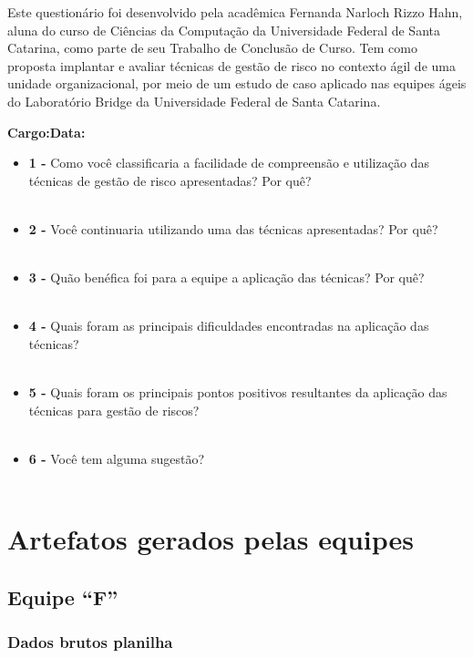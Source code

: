 \documentclass[
    12pt,       %
    openright,      %
    twoside,      %
    a4paper,      %
    english,      %
    french,       %
    spanish,      %
    brazil,       %
    ]{abntex2}
\begin{document}
\begin{apendicesenv}
 Este questionário foi desenvolvido pela acadêmica Fernanda Narloch Rizzo Hahn, aluna
do curso de Ciências da Computação da Universidade Federal de Santa Catarina, como
parte de seu Trabalho de Conclusão de Curso. Tem como proposta implantar e avaliar técnicas de gestão de risco no contexto ágil de uma unidade organizacional, por meio de um estudo de caso aplicado nas equipes ágeis do Laboratório Bridge da Universidade Federal de Santa Catarina.

\textbf{Cargo:}\hspace*{250pt}\textbf{Data:}

\begin{itemize} [label={}]
    \item \textbf{1 - } Como você classificaria a facilidade de compreensão e utilização das técnicas de gestão de risco apresentadas? Por quê? \\ \\
    \item \textbf{2 - } Você continuaria utilizando uma das técnicas apresentadas? Por quê? \\ \\
    \item \textbf{3 - } Quão benéfica foi para a equipe a aplicação das técnicas? Por quê? \\ \\
    \item \textbf{4 - } Quais foram as principais dificuldades encontradas na aplicação das técnicas? \\ \\
    \item \textbf{5 - } Quais foram os principais pontos positivos resultantes da aplicação das técnicas para gestão de riscos? \\ \\
    \item \textbf{6 - } Você tem alguma sugestão? \\ \\

\end{itemize}

 \chapter{Artefatos gerados pelas equipes}
 \label{sec:ApendiceC}
 \section{Equipe ``F''}
\subsection{Dados brutos planilha}


\end{apendicesenv}
\end{document}
